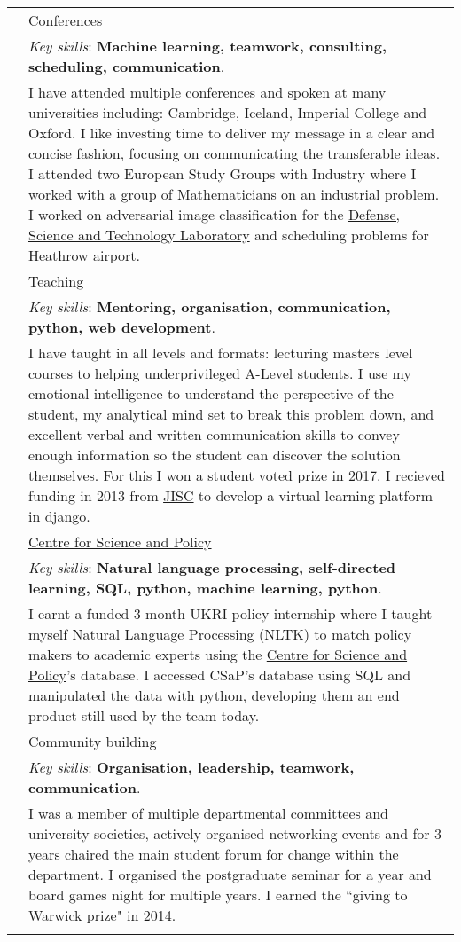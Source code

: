 \documentclass[a4paper,10pt]{article}
\newcommand{\tab}{\hspace{10 pt}}
\begin{document}
\begin{tabular}{p{2.25cm}|p{15cm}}
	 & \tab Conferences\\
	 & \footnotesize{\emph{Key skills}: \textbf{Machine learning, teamwork, consulting, scheduling, communication}.}\\
	 &	\footnotesize{I have attended multiple conferences and spoken at many universities including: Cambridge, Iceland, Imperial College and Oxford. I like investing time to deliver my message in a clear and concise fashion, focusing on communicating the transferable ideas. I attended two European Study Groups with Industry where I worked with a group of Mathematicians on an industrial problem. I worked on adversarial image classification for the \href{https://www.gov.uk/government/organisations/defence-science-and-technology-laboratory}{Defense, Science and Technology Laboratory} and scheduling problems for Heathrow airport.}\\	
	 & \tab Teaching\\
	 & \footnotesize{\emph{Key skills}: \textbf{Mentoring, organisation, communication, python, web development}.}\\
	 &	\footnotesize{I have taught in all levels and formats: lecturing masters level courses to helping underprivileged A-Level students. I use my emotional intelligence to understand the perspective of the student, my analytical mind set to break this problem down, and excellent verbal and written communication skills to convey enough information so the student can discover the solution themselves. For this I won a student voted prize in 2017. I recieved funding in 2013 from \href{https://www.jisc.ac.uk/}{JISC} to develop a virtual learning platform in django.}\\
	 & \tab \href{https://www.csap.cam.ac.uk/}{Centre for Science and Policy}\\
	 & \footnotesize{\emph{Key skills}: \textbf{Natural language processing, self-directed learning, SQL, python, machine learning, python}.}\\
	 &	\footnotesize{I earnt a funded 3 month UKRI policy internship where I taught myself Natural Language Processing (NLTK) to match policy makers to academic experts using the \href{https://www.csap.cam.ac.uk/}{Centre for Science and Policy}'s database. I accessed CSaP's database using SQL and manipulated the data with python, developing them an end product still used by the team today.}\vspace{0.05 in}\\
	 & \tab Community building\\
	 & \footnotesize{\emph{Key skills}: \textbf{Organisation, leadership, teamwork, communication}.}\\
	 &	\footnotesize{I was a member of multiple departmental committees and university societies, actively organised networking events and for 3 years chaired the main student forum for change within the department. I organised the postgraduate seminar for a year and board games night for multiple years. I earned the ``giving to Warwick prize" in 2014.}\\
\multicolumn{2}{c}{} \\
\end{tabular}
\vspace{-0.8cm}
\end{document}
